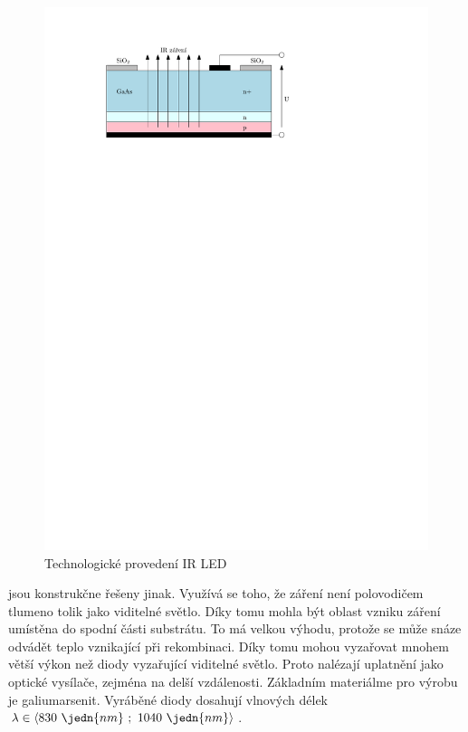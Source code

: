 \begin{figure}[!h]
    \begin{center}
        \includegraphics[scale=1]{img/ir-led}
    \end{center}
    \caption{Technologické provedení IR LED}
\end{figure}

  jsou konstrukčne řešeny jinak. Využívá se toho, že  záření není polovodičem tlumeno tolik jako viditelné světlo. Díky tomu mohla být oblast vzniku záření umístěna do spodní části substrátu. To má velkou výhodu, protože se může snáze odvádět teplo vznikající při rekombinaci. Díky tomu mohou   vyzařovat mnohem větší výkon než diody vyzařující viditelné světlo. Proto nalézají uplatnění jako optické vysílače, zejména na delší vzdálenosti. Základním materiálme pro výrobu   je galiumarsenit. Vyráběné diody dosahují vlnových délek $\lambda \in \langle 830~\jedn{nm}~;~1040~\jedn{nm} \rangle$.

